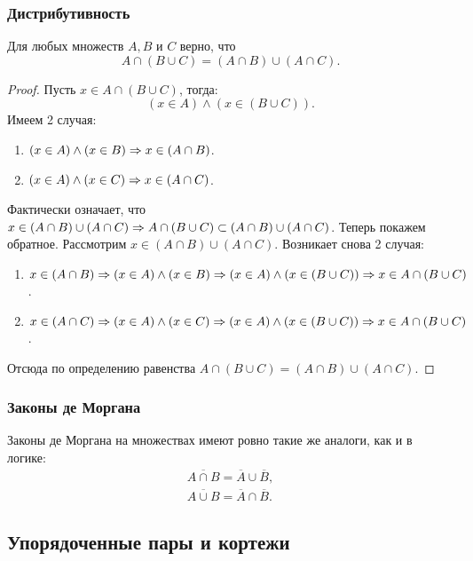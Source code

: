 \subsubsection*{Дистрибутивность}

\begin{proposition}
	Для любых множеств $A, B$ и $C$ верно, что
	$$
		A \cap (B \cup C) = (A \cap B) \cup (A \cap C).
	$$
\end{proposition}

\begin{proof}
	Пусть $x \in A \cap (B \cup C)$, тогда:
	$$
	(x \in A) \wedge (x \in (B \cup C)).
	$$
	Имеем 2 случая:
	\begin{enumerate}
		\item $(x \in A) \wedge (x \in B) \Rightarrow x \in (A \cap B)$.
		\item $(x \in A) \wedge (x \in C) \Rightarrow x \in (A \cap C)$.
	\end{enumerate}
	Фактически означает, что $x \in (A \cap B) \cup (A \cap C) \Rightarrow A \cap (B \cup C) \subset (A \cap B) \cup (A \cap C)$.
	Теперь покажем обратное. Рассмотрим $x \in (A \cap B) \cup (A \cap C)$.
	Возникает снова 2 случая:
	\begin{enumerate}
		\item $x \in (A \cap B) \Rightarrow (x \in A) \wedge (x \in B) \Rightarrow (x \in A) \wedge (x \in (B \cup C)) \Rightarrow x \in A \cap (B \cup C)$.
		\item $x \in (A \cap C) \Rightarrow (x \in A) \wedge (x \in C) \Rightarrow (x \in A) \wedge (x \in (B \cup C)) \Rightarrow x \in A \cap (B \cup C)$.
	\end{enumerate}

	Отсюда по определению равенства $A \cap (B \cup C) = (A \cap B) \cup (A \cap C)$.
\end{proof}

\subsubsection*{Законы де Моргана}

Законы де Моргана на множествах имеют ровно такие же аналоги, как и в логике:
\begin{align*}
	\overline{A \cap B} = \overline{A} \cup \overline{B},
	\\
	\overline{A \cup B} = \overline{A} \cap \overline{B}.
\end{align*}

\subsection{Упорядоченные пары и кортежи}

